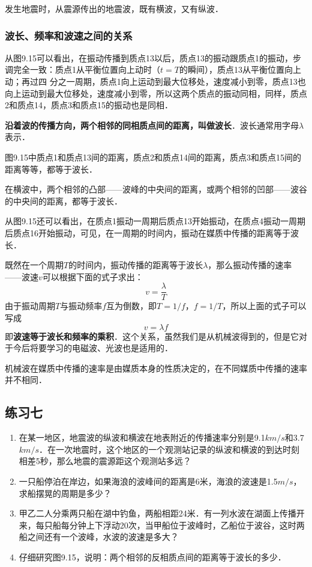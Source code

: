 发生地震时，从震源传出的地震波，既有横波，又有纵波．

\subsubsection{波长、频率和波速之间的关系}

从图9.15可以看出，在振动传播到质点13以后，质点13的振动跟质点1的振动，步调完全一致：质点1从平衡位置向上动时（$t=T$的瞬间），质点13从平衡位置向上动；再过四
分之一周期，质点1向上运动到最大位移处，速度减小到零，质点13也向上运动到最大位移处，速度减小到零，所以这两个质点的振动同相，同样，质点2和质点14，质点3和质点15的振动也是同相．

\textbf{沿着波的传播方向，两个相邻的同相质点间的距离，叫做波长}．波长通常用字母$\lambda$表示．

图9.15中质点1和质点13间的距离，质点2和质点14间的距离，质点3和质点15间的距离等等，都等于波长．

在横波中，两个相邻的凸部——波峰的中央间的距离，或两个相邻的凹部——波谷的中央间的距离，都等于波长．

从图9.15还可以看出，在质点1振动一周期后质点13开始振动，在质点4振动一周期后质点16开始振动，可见，在一周期的时间内，振动在媒质中传播的距离等于波长．

既然在一个周期$T$的时间内，振动传播的距离等于波长$\lambda$，那么振动传播的速率——波速$v$可以根据下面的式子求出：
\[v=\frac{\lambda}{T}\]
由于振动周期$T$与振动频率$f$互为倒数，即$T=1/f$，$f=1/T$，所以上面的式子可以写成
\[v=\lambda f\]
即\textbf{波速等于波长和频率的乘积}．这个关系，虽然我们是从机械波得到的，但是它对于今后将要学习的电磁波、光波也是适用的．

机械波在媒质中传播的速率是由媒质本身的性质决定的，在不同媒质中传播的速率并不相同．

\subsection*{练习七}
\begin{enumerate}
    \item 在某一地区，地震波的纵波和横波在地表附近的传播速率分别是9.1${ km}/{ s}$和3.7${ km}/{ s}$．在一次地震时，这个地区的一个观测站记录的纵波和横波的到达时刻相差5秒，那么地震的震源距这个观测站多远？
    \item 一只船停泊在岸边，如果海浪的波峰间的距离是6米，海浪的波速是1.5$\si{m/s}$，求船摆晃的周期是多少？
    \item 甲乙二人分乘两只船在湖中钓鱼，两船相距24米．有一列水波在湖面上传播开来，每只船每分钟上下浮动20次，当甲船位于波峰时，乙船位于波谷，这时两船之间还有一个波峰，水波的波速是多大？
    \item 仔细研究图9.15，说明：两个相邻的反相质点间的距离等于波长的多少．
\end{enumerate}

